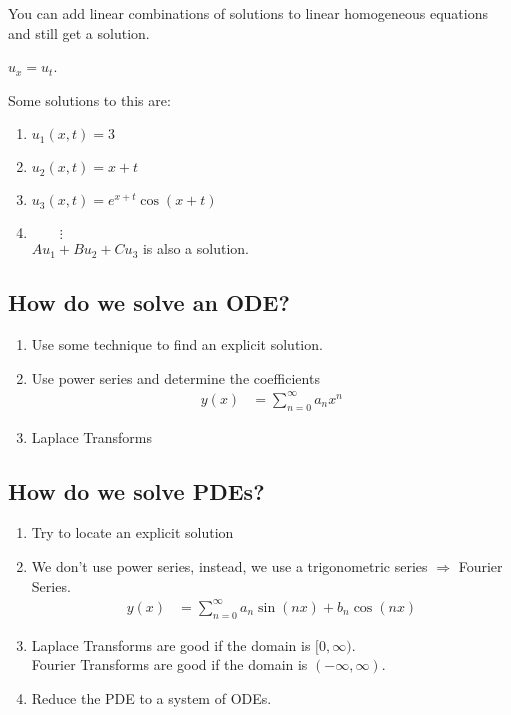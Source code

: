 \note You can add linear combinations of solutions to linear homogeneous equations and still get a solution.

\Ex $u_x = u_t$.

Some solutions to this are:
\begin{multicols}{2}
  \begin{enumerate}
    \item $u_1(x, t) = 3$
    \item $u_2(x, t) = x + t$
    \item $u_3(x, t) = e^{x+t} \cos(x + t)$
    \item $\qquad \vdots$\\
    $Au_1 + Bu_2 + Cu_3$ is also a solution.
\end{enumerate}
\end{multicols}

\subsection{How do we solve an ODE?}

\begin{enumerate}
  \item Use some technique to find an explicit solution.
  \item Use power series and determine the coefficients
  \begin{align}
    y(x) & = \sum^\infty_{n = 0} a_nx^n
  \end{align}
  \item Laplace Transforms
\end{enumerate}

\subsection{How do we solve PDEs?}

\begin{enumerate}
  \item Try to locate an explicit solution
  \item We don't use power series, instead, we use a trigonometric series $\Rightarrow$ Fourier Series.
  \begin{align}
    y(x) & = \sum^\infty_{n = 0} a_n \sin(nx) + b_n \cos(nx)
  \end{align}
  \item Laplace Transforms are good if the domain is $[0, \infty)$.\\
  Fourier Transforms are good if the domain is $(-\infty, \infty)$.
  \item Reduce the PDE to a system of ODEs.
\end{enumerate}

